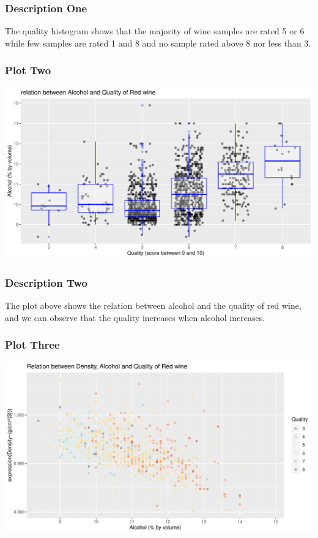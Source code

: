 \documentclass[]{article}
\begin{document}
\hypertarget{description-one}{%
\subsubsection{Description One}\label{description-one}}

The quality histogram shows that the majority of wine samples are rated
5 or 6 while few samples are rated 1 and 8 and no sample rated above 8
nor less than 3.

\hypertarget{plot-two}{%
\subsubsection{Plot Two}\label{plot-two}}

\begin{center}\includegraphics{Figs/Plot_Two-1} \end{center}

\hypertarget{description-two}{%
\subsubsection{Description Two}\label{description-two}}

The plot above shows the relation between alcohol and the quality of red
wine, and we can observe that the quality increases when alcohol
increases.

\hypertarget{plot-three}{%
\subsubsection{Plot Three}\label{plot-three}}

\begin{center}\includegraphics{Figs/Plot_Three-1} \end{center}
\end{document}
